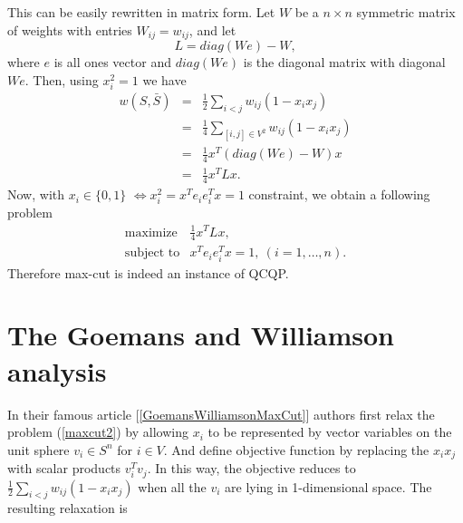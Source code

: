 \documentclass[12pt]{book}
\theoremstyle{definition}
\begin{document}
This can be easily rewritten in matrix form. Let $W$ be a $n\times n$ symmetric matrix of weights with entries $W_{ij} = w_{ij}$, and let
\begin{equation}
\label{LaplacianMatrix}
L = diag(We) - W,
\end{equation}
 where $e$ is all ones vector and $diag(We)$ is the diagonal matrix with diagonal $We$.
Then, using $x_i^2 = 1$ we have
\begin{eqnarray}
w(S,\bar{S}) & = & \frac{1}{2}\sum_{i<j}w_{ij}(1-x_ix_j )  \\
			 & = & \frac{1}{4}\sum_{[i,j]\in V^2}w_{ij}(1-x_ix_j ) \\
			 & = & \frac{1}{4}x^T(diag(We) - W)x  \\
			 & = & \frac{1}{4}x^TLx.
\end{eqnarray}
Now, with $x_i \in \{0,1\}$ $\Leftrightarrow x_i^2 = x^Te_ie_i^Tx = 1$ constraint, we obtain a following problem
\begin{equation}
\label{maxcut3}
\begin{array}{ll}
\mbox{maximize} & \frac{1}{4}x^TLx, \\
\mbox{subject to} &  x^Te_ie_i^Tx = 1, \  (i = 1,\dots ,n).
\end{array}
\end{equation}
Therefore max-cut is indeed an instance of QCQP.


\section{The Goemans and Williamson analysis}

In their famous article [\ref{GoemansWilliamsonMaxCut}] authors first relax the problem (\ref{maxcut2})
by allowing $x_i$ to be represented by vector variables on the unit sphere $v_i\in S^n$ for $i\in V$. 
And define objective function by replacing the $x_ix_j$ with scalar products $v_i^Tv_j$.
In this way, the objective reduces to $ \frac{1}{2}\sum_{i<j}w_{ij}(1-x_ix_j )$ when all the $v_i$ are lying in 1-dimensional space.
The resulting relaxation is 
 
\end{document}
